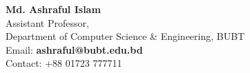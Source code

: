 \textbf{Md. Ashraful Islam} \\
Assistant Professor, \\
Department of Computer Science \& Engineering, BUBT \\
Email: \textbf{ashraful@bubt.edu.bd} \\
Contact: +88 01723 777711

